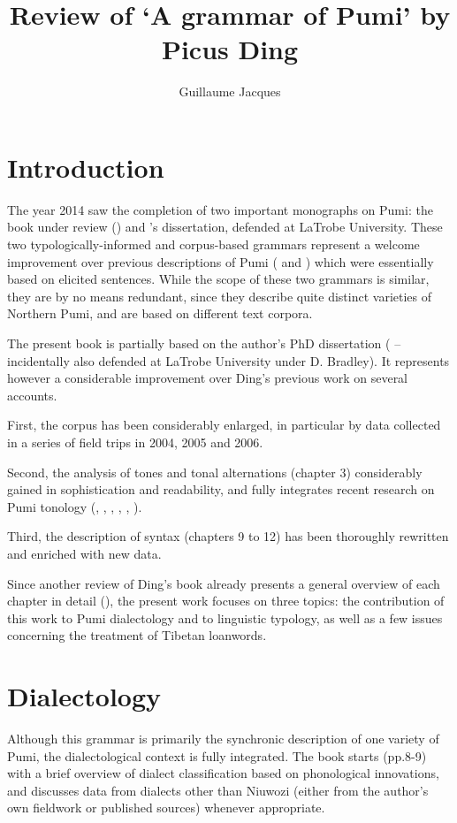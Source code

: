 \documentclass[oldfontcommands,oneside,a4paper,11pt]{article}
\begin{document}
\title{Review of `A grammar of Pumi' by Picus Ding}
\author{Guillaume Jacques}
\maketitle

\sloppy


\section{Introduction}
The year 2014 saw the completion of two important monographs on Pumi: the book under review (\citealt{ding14grammar}) and \citet{daudey14grammar}'s dissertation, defended at LaTrobe University. These two typologically-informed and corpus-based grammars represent a welcome improvement over previous descriptions of Pumi (\citealt{fual98pumi} and   \citealt{lusz01pumi}) which were essentially based on elicited sentences. While the scope of these two grammars is similar, they are by no means redundant, since they describe quite distinct varieties of Northern Pumi, and are based on different text corpora.

The present book is partially based on the author's PhD dissertation (\citealt{ding98phd} -- incidentally also defended at LaTrobe University under D. Bradley). It represents however a considerable improvement over Ding's previous work on several accounts. 

First, the corpus has been considerably enlarged, in particular by data collected in a series of field trips in 2004, 2005 and 2006.

Second, the analysis of tones and tonal alternations (chapter 3)  considerably gained in sophistication and readability, and fully integrates recent research on Pumi tonology  (\citealt{matisoff97pumi},  \citealt{ding01pitch},  \citealt{ding03sketch}, \citealt{ding06tonal}, \citealt{ding07perception}, \citealt{jacques11pumi.tone}).

Third, the description of syntax (chapters 9 to 12) has been thoroughly rewritten and enriched with new data.  

Since another review of Ding's book already presents a general overview of each chapter in detail (\citealt{daudey15review}), the present work focuses on three topics: the contribution of this work to Pumi dialectology and to linguistic typology, as well as a few issues concerning the treatment of Tibetan loanwords.


\section{Dialectology}
Although this grammar is primarily the synchronic description of one variety of Pumi,  the dialectological context is fully integrated. The book starts (pp.8-9) with a brief overview of dialect classification based on phonological innovations, and discusses data from dialects other than Niuwozi (either from the author's own fieldwork or published sources) whenever appropriate. 
\end{document}
